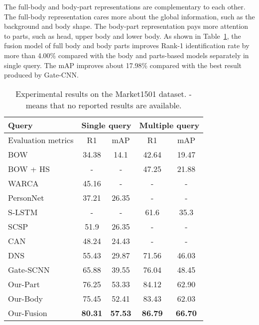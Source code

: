 \documentclass[10pt,twocolumn,letterpaper]{article}
\begin{document}
The full-body and body-part representations are complementary to each other.
The full-body representation cares more about the global information, such as the background and body shape.
The body-part representation pays more attention to parts, such as head, upper body and lower body.
As shown in Table~\ref{tab:marketresults}, the fusion model of full body and body parts improves Rank-1 identification rate by more than 4.00\%
compared with the body and parts-based models separately in single query.
The mAP improves about 17.98\% compared with the best result produced by Gate-CNN.

\begin{table}[!tbp]
  \begin{center}
  \scriptsize
    \begin{tabular}{|l|cc|cc|}
    \hline
    Query & \multicolumn{2}{c|}{Single query} & \multicolumn{2}{c|}{Multiple query} \\
    \hline
    Evaluation metrics & R1    & mAP   & R1    & mAP \\
    \hline
    \hline
    BOW~\cite{ZhengliangICCV15}  & 34.38 & 14.1  & 42.64 & 19.47 \\
    BOW + HS~\cite{ZhengliangICCV15} & -     & -     & 47.25 & 21.88 \\
    \hline
    WARCA~\cite{Jose2016scalable} & 45.16 & -     & -     & - \\
    PersonNet~\cite{Wulin2016Personnet} & 37.21 & 26.35 & -     & - \\
    S-LSTM~\cite{Varior2016Siamese} & -     & -     & 61.6  & 35.3 \\
    SCSP~\cite{Chengde2016person}  & 51.9  & 26.35 & -     & - \\
    CAN~\cite{liu2017end}   & 48.24 & 24.43 & -     & - \\
    DNS~\cite{ZhangLiCVPR16}   & 55.43  & 29.87  & 71.56  & 46.03  \\
    Gate-SCNN~\cite{VariorECCV16Gated} & 65.88  & 39.55  & 76.04  & 48.45  \\
    \hline
    \hline
    Our-Part & 76.25  & 53.33  & 84.12  & 62.90    \\
    Our-Body & 75.45  & 52.41  & 83.43  & 62.03    \\
    Our-Fusion & \textbf{80.31}  & \textbf{57.53}  & \textbf{86.79}  & \textbf{66.70}  \\
    \hline
    \end{tabular}\end{center}
  \vspace{-0.5em}
  \caption{Experimental results on the Market1501 dataset. - means that no reported results are available.}
  \label{tab:marketresults}\vspace{-2em}
\end{table}
\end{document}
